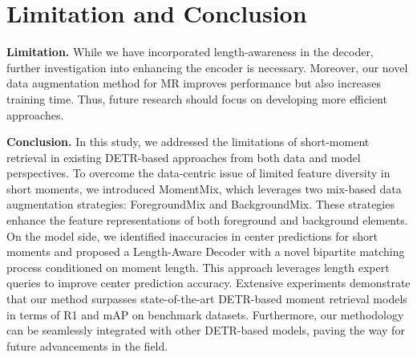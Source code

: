 \section{Limitation and Conclusion}
\label{sec:conclusion}
\noindent\textbf{Limitation.} While we have incorporated length-awareness in the decoder, further investigation into enhancing the encoder is necessary. Moreover, our novel data augmentation method for MR improves performance but also increases training time. Thus, future research should focus on developing more efficient approaches.

\noindent\textbf{Conclusion.}
In this study, we addressed the limitations of short-moment retrieval in existing DETR-based approaches from both data and model perspectives. To overcome the data-centric issue of limited feature diversity in short moments, we introduced MomentMix, which leverages two mix-based data augmentation strategies: ForegroundMix and BackgroundMix. These strategies enhance the feature representations of both foreground and background elements. On the model side, we identified inaccuracies in center predictions for short moments and proposed a Length-Aware Decoder with a novel bipartite matching process conditioned on moment length. This approach leverages length expert queries to improve center prediction accuracy. Extensive experiments demonstrate that our method surpasses state-of-the-art DETR-based moment retrieval models in terms of R1 and mAP on benchmark datasets. Furthermore, our methodology can be seamlessly integrated with other DETR-based models, paving the way for future advancements in the field.

{
    \small
        }

\clearpage
\newpage
\setcounter{page}{1}
\maketitlesupplementary

